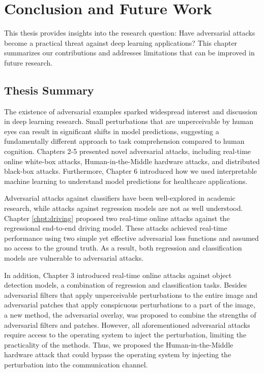 \chapter{Conclusion and Future Work}
\label{chpt:conclusion}

This thesis provides insights into the research question: Have adversarial attacks become a practical threat against deep learning applications? This chapter summarizes our contributions and addresses limitations that can be improved in future research.

\section{Thesis Summary}

The existence of adversarial examples sparked widespread interest and discussion in deep learning research. Small perturbations that are unperceivable by human eyes can result in significant shifts in model predictions, suggesting a fundamentally different approach to task comprehension compared to human cognition. Chapters 2-5 presented novel adversarial attacks, including real-time online white-box attacks, Human-in-the-Middle hardware attacks, and distributed black-box attacks. Furthermore, Chapter 6 introduced how we used interpretable machine learning to understand model predictions for healthcare applications.

Adversarial attacks against classifiers have been well-explored in academic research, while attacks against regression models are not as well understood. Chapter \ref{chpt:driving} proposed two real-time online attacks against the regressional end-to-end driving model. These attacks achieved real-time performance using two simple yet effective adversarial loss functions and assumed no access to the ground truth. As a result, both regression and classification models are vulnerable to adversarial attacks.

In addition, Chapter 3 introduced real-time online attacks against object detection models, a combination of regression and classification tasks. Besides adversarial filters that apply unperceivable perturbations to the entire image and adversarial patches that apply conspicuous perturbations to a part of the image, a new method, the adversarial overlay, was proposed to combine the strengths of adversarial filters and patches. However, all aforementioned adversarial attacks require access to the operating system to inject the perturbation, limiting the practicality of the methods. Thus, we proposed the Human-in-the-Middle hardware attack that could bypass the operating system by injecting the perturbation into the communication channel.

